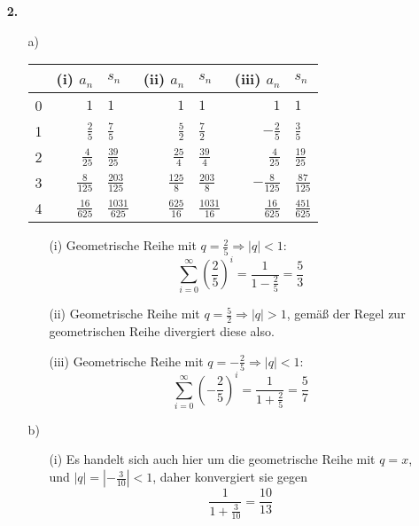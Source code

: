 \documentclass[a4paper,11pt]{scrartcl}
\newcommand{\bra}[1]{\left(#1\right)}
\newcommand{\rowi}[1]{\sum_{i=#1}^{\infty}}
\newcommand{\row}{\rowi{0}}
\begin{document}
\begin{enumerate}
    \item[\textbf{2.}]
        \begin{enumerate}
            \item[a)]
            \begin{tabular}[t]{|r|rl|rl|rl|}
            \hline
              & (i) $a_n$ & $s_n$ & (ii) $a_n$ & $s_n$ & (iii) $a_n$ & $s_n$ \\ \hline
            0 & $1$              & $1$                & $1$              & $1$               & $1$              & $1$ \\[0.5em]
            1 & $\frac{2}{5}$    & $\frac{7}{5}$      & $\frac{5}{2}$    & $\frac{7}{2}$     & $-\frac{2}{5}$   & $\frac{3}{5}$ \\[0.5em]
            2 & $\frac{4}{25}$   & $\frac{39}{25}$    & $\frac{25}{4}$   & $\frac{39}{4}$    & $\frac{4}{25}$   & $\frac{19}{25}$ \\[0.5em]
            3 & $\frac{8}{125}$  & $\frac{203}{125}$  & $\frac{125}{8}$  & $\frac{203}{8}$   & $-\frac{8}{125}$ & $\frac{87}{125}$ \\[0.5em]
            4 & $\frac{16}{625}$ & $\frac{1031}{625}$ & $\frac{625}{16}$ & $\frac{1031}{16}$ & $\frac{16}{625}$ & $\frac{451}{625}$ \\[0.5em]
            \hline
            \end{tabular}

            \begin{enumerate}
                \item[(i)]
                    Geometrische Reihe mit $q = \frac{2}{5} \Rightarrow |q| < 1$:
                    $$\row\bra{\frac{2}{5}}^i = \frac{1}{1 - \frac{2}{5}} = \frac{5}{3}$$

                \item[(ii)]
                    Geometrische Reihe mit $q = \frac{5}{2} \Rightarrow |q| > 1$,
                    gemäß der Regel zur geometrischen Reihe divergiert diese also.

                \item[(iii)]
                    Geometrische Reihe mit $q = -\frac{2}{5} \Rightarrow |q| < 1$:
                    $$\row\bra{-\frac{2}{5}}^i = \frac{1}{1 + \frac{2}{5}} = \frac{5}{7}$$


            \end{enumerate}
            \item[b)]
                \begin{enumerate}
                    \item[(i)]
                        Es handelt sich auch hier um die geometrische Reihe mit $q = x$,
                        und $|q| = |-\frac{3}{10}| < 1$, daher konvergiert sie gegen
                        $$\frac{1}{1 + \frac{3}{10}} = \frac{10}{13}$$


\end{enumerate}
\end{enumerate}
\end{enumerate}
\end{document}

